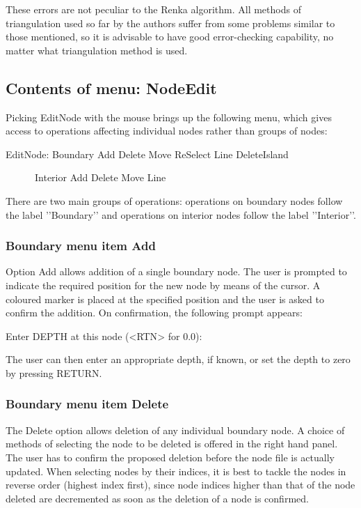 \documentclass{article}
\begin{document}
These errors are not peculiar to the Renka algorithm. All methods of triangulation used so far by the authors suffer from some problems similar to those mentioned, so it is advisable to have good error-checking capability, no matter what triangulation method is used.

\subsection{Contents of menu: NodeEdit}
Picking EditNode with the mouse brings up the following menu, which gives access to operations affecting individual nodes rather than groups of nodes:

EditNode: Boundary {\textbar} Add Delete Move ReSelect Line DeleteIsland {\textbar} \ \ 

\ \ \ \ \ \ Interior {\textbar} Add Delete Move Line 

There are two main groups of operations: operations on boundary nodes follow the label '{}'Boundary'{}' and operations on interior nodes follow the label '{}'Interior'{}'.

\subsubsection[Boundary menu item Add]{Boundary menu item Add}
Option Add allows addition of a single boundary node. The user is prompted to indicate the required position for the new node by means of the cursor. A coloured marker is placed at the specified position and the user is asked to confirm the addition. On confirmation, the following prompt appears:

Enter DEPTH at this node ({\textless}RTN{\textgreater} for 0.0):

The user can then enter an appropriate depth, if known, or set the depth to zero by pressing RETURN.

\subsubsection[Boundary menu item Delete]{Boundary menu item Delete}
The Delete option allows deletion of any individual boundary node. A choice of methods of selecting the node to be deleted is offered in the right hand panel. The user has to confirm the proposed deletion before the node file is actually updated. When selecting nodes by their indices, it is best to tackle the nodes in reverse order (highest index first), since node indices higher than that of the node deleted are decremented as soon as the deletion of a node is confirmed.
\end{document}
